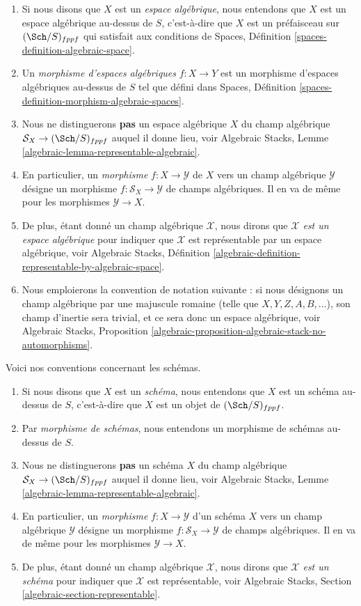 \begin{enumerate}
\item Si nous disons que $X$ est un {\it espace algébrique}, nous entendons que
$X$ est un espace algébrique au-dessus de $S$, c'est-à-dire que $X$ est un préfaisceau sur
$(\Sch/S)_{fppf}$ qui satisfait aux conditions de
Spaces, Définition \ref{spaces-definition-algebraic-space}.
\item Un {\it morphisme d'espaces algébriques} $f :X \to Y$ est un morphisme
d'espaces algébriques au-dessus de $S$ tel que défini dans
Spaces, Définition \ref{spaces-definition-morphism-algebraic-spaces}.
\item Nous ne distinguerons {\bf pas} un espace algébrique $X$
du champ algébrique $\mathcal{S}_X \to (\Sch/S)_{fppf}$
auquel il donne lieu, voir
Algebraic Stacks, Lemme \ref{algebraic-lemma-representable-algebraic}.
\item En particulier, un {\it morphisme} $f : X \to \mathcal{Y}$ de $X$
vers un champ algébrique $\mathcal{Y}$ désigne un morphisme
$f : \mathcal{S}_X \to \mathcal{Y}$ de champs algébriques.
Il en va de même pour les morphismes $\mathcal{Y} \to X$.
\item De plus, étant donné un champ algébrique $\mathcal{X}$, nous dirons que
{\it $\mathcal{X}$ est un espace algébrique} pour indiquer que $\mathcal{X}$
est représentable par un espace algébrique, voir
Algebraic Stacks,
Définition \ref{algebraic-definition-representable-by-algebraic-space}.
\item Nous emploierons la convention de notation suivante : si nous
désignons un champ algébrique par une majuscule romaine
(telle que $X, Y, Z, A, B, \ldots$), son
champ d'inertie sera trivial, et ce sera donc un espace algébrique, voir
Algebraic Stacks,
Proposition \ref{algebraic-proposition-algebraic-stack-no-automorphisms}.
\end{enumerate}
Voici nos conventions concernant les schémas.
\begin{enumerate}
\item Si nous disons que $X$ est un {\it schéma}, nous entendons que
$X$ est un schéma au-dessus de $S$, c'est-à-dire que $X$ est un objet de $(\Sch/S)_{fppf}$.
\item Par {\it morphisme de schémas}, nous entendons un morphisme de schémas au-dessus de $S$.
\item Nous ne distinguerons {\bf pas} un schéma $X$ du
champ algébrique $\mathcal{S}_X \to (\Sch/S)_{fppf}$ auquel il donne lieu,
voir
Algebraic Stacks, Lemme \ref{algebraic-lemma-representable-algebraic}.
\item En particulier, un {\it morphisme} $f : X \to \mathcal{Y}$ d'un
schéma $X$ vers un champ algébrique $\mathcal{Y}$ désigne un morphisme
$f : \mathcal{S}_X \to \mathcal{Y}$ de champs algébriques.
Il en va de même pour les morphismes $\mathcal{Y} \to X$.
\item De plus, étant donné un champ algébrique $\mathcal{X}$, nous dirons que
{\it $\mathcal{X}$ est un schéma} pour indiquer que $\mathcal{X}$
est représentable, voir
Algebraic Stacks, Section \ref{algebraic-section-representable}.
\end{enumerate}
